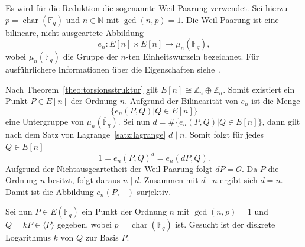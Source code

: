 Es wird für die Reduktion die sogenannte Weil-Paarung verwendet. Sei hierzu $p=\operatorname{char}(\mathbb{F}_q)$ und $n\in\mathbb{N}$ mit $\gcd(n,p)=1$. Die Weil-Paarung ist eine bilineare, nicht ausgeartete Abbildung
\[
e_n:E[n]\times E[n]\rightarrow \mu_n(\overline{\mathbb{F}}_q),
\]
wobei $\mu_n(\overline{\mathbb{F}}_q)$ die Gruppe der $n$-ten Einheitswurzeln bezeichnet. Für ausführlichere Informationen über die Eigenschaften siehe~\cite[S.~83]{werner02}. 

Nach Theorem~\ref{theo:torsionsstruktur} gilt $E[n]\cong\mathbb{Z}_n \oplus \mathbb{Z}_n$. Somit existiert ein Punkt $P\in E[n]$ der Ordnung $n$. Aufgrund der Bilinearität von $e_n$ ist die Menge
\[
\{e_n(P,Q)| Q\in E[n]\}
\]
eine Untergruppe von $\mu_n(\overline{\mathbb{F}}_q)$. Sei nun $d=\#\{e_n(P,Q)| Q\in E[n]\}$, dann gilt nach dem Satz von Lagrange~\ref{satz:lagrange} $d\mid n$. Somit folgt für jedes $Q\in E[n]$ 
\[
    1=e_n{(P,Q)}^d=e_n(dP,Q).
\]
Aufgrund der Nichtausgeartetheit der Weil-Paarung folgt $dP=\mathcal{O}$. Da $P$ die Ordnung $n$ besitzt, folgt daraus $n\mid d$. Zusammen mit $d\mid n$ ergibt sich $d=n$.
Damit ist die Abbildung $e_n(P,-)$ surjektiv.

Sei nun $P\in E(\mathbb{F}_q)$ ein Punkt der Ordnung $n$ mit $\gcd(n,p)=1$ und $Q=kP\in\langle P \rangle$ gegeben, wobei $p=\operatorname{char}(\mathbb{F}_q)$ ist. Gesucht ist der diskrete Logarithmus $k$ von $Q$ zur Basis $P$.

